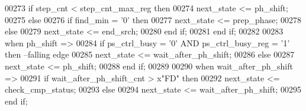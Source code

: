\begin{DoxyCode}
00273          \textcolor{keywordflow}{if} \textcolor{vhdlchar}{step_cnt} \textcolor{vhdlchar}{<} \textcolor{vhdlchar}{step_cnt_max_reg} \textcolor{keywordflow}{then} 
00274             \textcolor{vhdlchar}{next_state} \textcolor{vhdlchar}{<=} \textcolor{vhdlchar}{ph\_shift};
00275          \textcolor{keywordflow}{else}
00276             \textcolor{keywordflow}{if} \textcolor{vhdlchar}{find_min} \textcolor{vhdlchar}{=} \textcolor{vhdlchar}{'}\textcolor{vhdllogic}{}\textcolor{vhdllogic}{0}\textcolor{vhdlchar}{'} \textcolor{keywordflow}{then} 
00277                \textcolor{vhdlchar}{next_state} \textcolor{vhdlchar}{<=} \textcolor{vhdlchar}{prep\_phase};
00278             \textcolor{keywordflow}{else} 
00279                \textcolor{vhdlchar}{next_state} \textcolor{vhdlchar}{<=} \textcolor{vhdlchar}{end\_srch};
00280             \textcolor{keywordflow}{end} \textcolor{keywordflow}{if};
00281          \textcolor{keywordflow}{end} \textcolor{keywordflow}{if};
00282          
00283       \textcolor{keywordflow}{when} \textcolor{vhdlchar}{ph\_shift} \textcolor{vhdlchar}{=}\textcolor{vhdlchar}{>}
00284          \textcolor{keywordflow}{if} \textcolor{vhdlchar}{ps_ctrl_busy} \textcolor{vhdlchar}{=} \textcolor{vhdlchar}{'}\textcolor{vhdllogic}{}\textcolor{vhdllogic}{0}\textcolor{vhdlchar}{'} \textcolor{keywordflow}{AND} \textcolor{vhdlchar}{ps_ctrl_busy_reg} \textcolor{vhdlchar}{=} \textcolor{vhdlchar}{'}\textcolor{vhdllogic}{}\textcolor{vhdllogic}{1}\textcolor{vhdlchar}{'} \textcolor{keywordflow}{then}\textcolor{keyword}{  --falling edge }
00285             \textcolor{vhdlchar}{next_state} \textcolor{vhdlchar}{<=} \textcolor{vhdlchar}{wait\_after\_ph\_shift};              
00286          \textcolor{keywordflow}{else} 
00287             \textcolor{vhdlchar}{next_state} \textcolor{vhdlchar}{<=} \textcolor{vhdlchar}{ph\_shift};
00288          \textcolor{keywordflow}{end} \textcolor{keywordflow}{if};
00289          
00290       \textcolor{keywordflow}{when} \textcolor{vhdlchar}{wait\_after\_ph\_shift} \textcolor{vhdlchar}{=}\textcolor{vhdlchar}{>} 
00291          \textcolor{keywordflow}{if} \textcolor{vhdlchar}{wait_after_ph_shift_cnt} \textcolor{vhdlchar}{>} \textcolor{vhdlchar}{x}\textcolor{keyword}{"FD"} \textcolor{keywordflow}{then} 
00292             \textcolor{vhdlchar}{next_state} \textcolor{vhdlchar}{<=} \textcolor{vhdlchar}{check\_cmp\_status};
00293          \textcolor{keywordflow}{else} 
00294             \textcolor{vhdlchar}{next_state} \textcolor{vhdlchar}{<=} \textcolor{vhdlchar}{wait\_after\_ph\_shift};
00295          \textcolor{keywordflow}{end} \textcolor{keywordflow}{if};

\end{DoxyCode}
